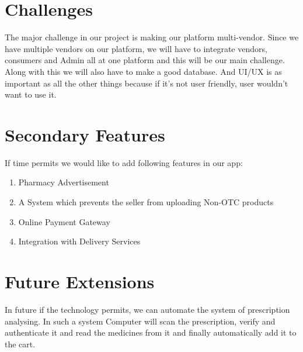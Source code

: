 \documentclass[fleqn,10pt]{../SelfArx} %
\begin{document}
\section{Challenges}
The major challenge in our project is making our platform multi-vendor. Since we have multiple vendors on our platform, we will have to integrate vendors, consumers and Admin all at one platform and this will be our main challenge. Along with this we will also have to make a good database. And UI/UX is as important as all the other things because if it's not user friendly, user wouldn't want to use it.

\section{Secondary Features}
If time permits we would like to add following features in our app:
\begin{enumerate}
\item Pharmacy Advertisement
\item A System which prevents the seller from uploading Non-OTC products
\item Online Payment Gateway
\item Integration with Delivery Services
\end{enumerate}

\section{Future Extensions}
In future if the technology permits, we can automate the system of prescription analysing. In such a system Computer will scan the prescription, verify and authenticate it and read the medicines from it and finally automatically add it to the cart.
\end{document}
